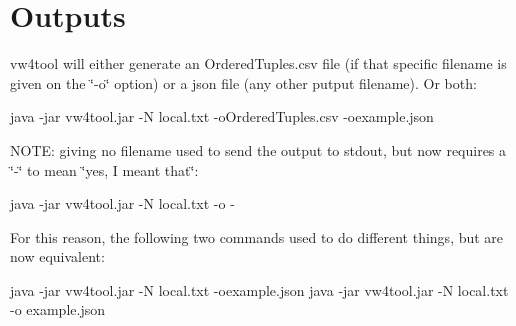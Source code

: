 \section*{Outputs }

vw4tool will either generate an Ordered\+Tuples.\+csv file (if that specific filename is given on the \char`\"{}-\/o\char`\"{} option) or a json file (any other putput filename). Or both\+: \begin{DoxyVerb}java -jar vw4tool.jar  -N local.txt -oOrderedTuples.csv -oexample.json
\end{DoxyVerb}


N\+O\+T\+E\+: giving no filename used to send the output to stdout, but now requires a \char`\"{}-\/\char`\"{} to mean \char`\"{}yes, I meant that\char`\"{}\+: \begin{DoxyVerb}java -jar vw4tool.jar  -N local.txt -o -
\end{DoxyVerb}


For this reason, the following two commands used to do different things, but are now equivalent\+: \begin{DoxyVerb}java -jar vw4tool.jar  -N local.txt -oexample.json
java -jar vw4tool.jar  -N local.txt -o example.json\end{DoxyVerb}
 